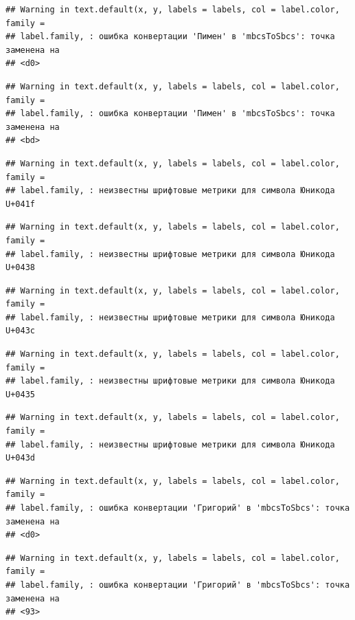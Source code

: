 \documentclass[]{book}
\begin{document}
\begin{verbatim}
## Warning in text.default(x, y, labels = labels, col = label.color, family =
## label.family, : ошибка конвертации 'Пимен' в 'mbcsToSbcs': точка заменена на
## <d0>
\end{verbatim}

\begin{verbatim}
## Warning in text.default(x, y, labels = labels, col = label.color, family =
## label.family, : ошибка конвертации 'Пимен' в 'mbcsToSbcs': точка заменена на
## <bd>
\end{verbatim}

\begin{verbatim}
## Warning in text.default(x, y, labels = labels, col = label.color, family =
## label.family, : неизвестны шрифтовые метрики для символа Юникода U+041f
\end{verbatim}

\begin{verbatim}
## Warning in text.default(x, y, labels = labels, col = label.color, family =
## label.family, : неизвестны шрифтовые метрики для символа Юникода U+0438
\end{verbatim}

\begin{verbatim}
## Warning in text.default(x, y, labels = labels, col = label.color, family =
## label.family, : неизвестны шрифтовые метрики для символа Юникода U+043c
\end{verbatim}

\begin{verbatim}
## Warning in text.default(x, y, labels = labels, col = label.color, family =
## label.family, : неизвестны шрифтовые метрики для символа Юникода U+0435
\end{verbatim}

\begin{verbatim}
## Warning in text.default(x, y, labels = labels, col = label.color, family =
## label.family, : неизвестны шрифтовые метрики для символа Юникода U+043d
\end{verbatim}

\begin{verbatim}
## Warning in text.default(x, y, labels = labels, col = label.color, family =
## label.family, : ошибка конвертации 'Григорий' в 'mbcsToSbcs': точка заменена на
## <d0>
\end{verbatim}

\begin{verbatim}
## Warning in text.default(x, y, labels = labels, col = label.color, family =
## label.family, : ошибка конвертации 'Григорий' в 'mbcsToSbcs': точка заменена на
## <93>
\end{verbatim}
\end{document}
